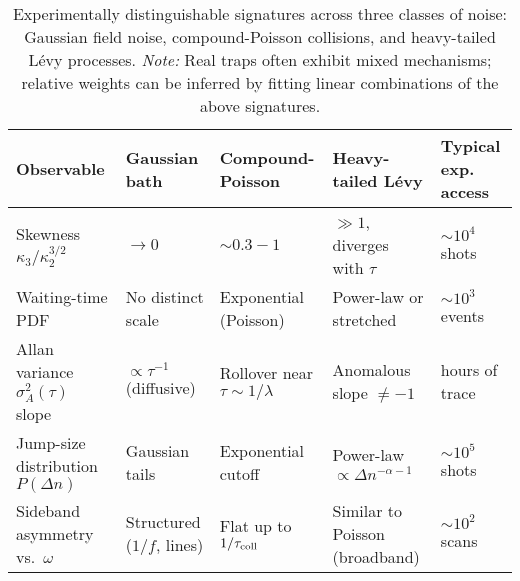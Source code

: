 \begin{table}[h]
\centering
\renewcommand{\arraystretch}{1.2}
\begin{tabularx}{\textwidth}{>{\raggedright\arraybackslash}p{3.2cm}
                                  >{\raggedright\arraybackslash}X
                                  >{\raggedright\arraybackslash}X
                                  >{\raggedright\arraybackslash}X
                                  >{\raggedright\arraybackslash}p{2.8cm}}
\hline
\textbf{Observable} 
& \textbf{Gaussian bath} 
& \textbf{Compound-Poisson} 
& \textbf{Heavy-tailed L\'evy} 
& \textbf{Typical exp. access} \\
\hline
Skewness $\kappa_3/\kappa_2^{3/2}$ 
& $\to 0$ 
& $\sim 0.3{-}1$ 
& $\gg 1$, diverges with $\tau$ 
& $\sim 10^4$ shots \\

Waiting-time PDF 
& No distinct scale 
& Exponential (Poisson) 
& Power-law or stretched 
& $\sim 10^3$ events \\

Allan variance $\sigma_A^2(\tau)$ slope 
& $\propto \tau^{-1}$ (diffusive) 
& Rollover near $\tau \sim 1/\lambda$ 
& Anomalous slope $\neq -1$ 
& hours of trace \\

Jump-size distribution $P(\Delta n)$ 
& Gaussian tails 
& Exponential cutoff 
& Power-law $\propto \Delta n^{-\alpha-1}$ 
& $\sim 10^5$ shots \\

Sideband asymmetry vs.\ $\omega$ 
& Structured ($1/f$, lines) 
& Flat up to $1/\tau_{\rm coll}$ 
& Similar to Poisson (broadband) 
& $\sim 10^2$ scans \\
\hline
\end{tabularx}
\caption{Experimentally distinguishable signatures across three classes of noise: Gaussian field noise, compound-Poisson collisions, and heavy-tailed L\'evy processes. \emph{Note:} Real traps often exhibit mixed mechanisms; relative weights can be inferred by fitting linear combinations of the above signatures.}
\end{table}
